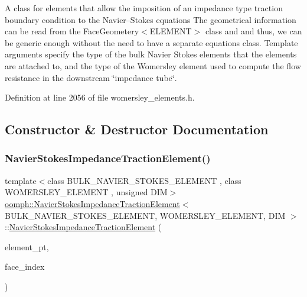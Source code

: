 A class for elements that allow the imposition of an impedance type traction boundary condition to the Navier--Stokes equations The geometrical information can be read from the Face\+Geometery$<$\+E\+L\+E\+M\+E\+N\+T$>$ class and and thus, we can be generic enough without the need to have a separate equations class. Template arguments specify the type of the bulk Navier Stokes elements that the elements are attached to, and the type of the Womersley element used to compute the flow resistance in the downstream \char`\"{}impedance tube\char`\"{}. 

Definition at line 2056 of file womersley\+\_\+elements.\+h.



\subsection{Constructor \& Destructor Documentation}
\mbox{\label{classoomph_1_1NavierStokesImpedanceTractionElement_a6d3191bb5be1c304b71e24140017eab5}} 
\subsubsection{\texorpdfstring{Navier\+Stokes\+Impedance\+Traction\+Element()}{NavierStokesImpedanceTractionElement()}}
{\footnotesize\ttfamily template$<$class B\+U\+L\+K\+\_\+\+N\+A\+V\+I\+E\+R\+\_\+\+S\+T\+O\+K\+E\+S\+\_\+\+E\+L\+E\+M\+E\+NT , class W\+O\+M\+E\+R\+S\+L\+E\+Y\+\_\+\+E\+L\+E\+M\+E\+NT , unsigned D\+IM$>$ \\
\hyperlink{classoomph_1_1NavierStokesImpedanceTractionElement}{oomph\+::\+Navier\+Stokes\+Impedance\+Traction\+Element}$<$ B\+U\+L\+K\+\_\+\+N\+A\+V\+I\+E\+R\+\_\+\+S\+T\+O\+K\+E\+S\+\_\+\+E\+L\+E\+M\+E\+NT, W\+O\+M\+E\+R\+S\+L\+E\+Y\+\_\+\+E\+L\+E\+M\+E\+NT, D\+IM $>$\+::\hyperlink{classoomph_1_1NavierStokesImpedanceTractionElement}{Navier\+Stokes\+Impedance\+Traction\+Element} (\begin{DoxyParamCaption}\item[{\hyperlink{classoomph_1_1FiniteElement}{Finite\+Element} $\ast$const \&}]{element\+\_\+pt,  }\item[{const int \&}]{face\+\_\+index }\end{DoxyParamCaption})\hspace{0.3cm}{\ttfamily [inline]}}

